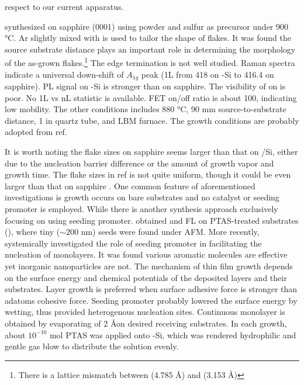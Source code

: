 respect to our current apparatus.

\citeauthor{Zhang2013h} synthesized  on sapphire (0001) using  powder and sulfur as precursor under 900 \si{\degreeCelsius}.\cite{Zhang2013h} Ar slightly mixed with  is used to tailor the shape of  flakes. It was found the source substrate distance plays an important role in determining the morphology of the as-grown flakes.\footnote{There is a lattice mismatch between  (4.785 \AA) and  (3.153 \AA)} The edge termination is not well studied. Raman spectra indicate a universal down-shift of $A_{1g}$ peak (1L from 418 on -Si to 416.4 on sapphire). PL signal on -Si is stronger than on sapphire. The visibility of  on  is poor. No 1L vs nL statistic is available. FET on/off ratio is about 100, indicating low mobility. The other conditions includes 880 \si{\degreeCelsius}, 90 mm source-to-substrate distance, 1 in quartz tube, and LBM furnace. The growth conditions are probably adopted from ref\cite{Huanga2013}.

It is worth noting the flake sizes on sapphire\cite{Zhang2013h} seems larger than that on /Si\cite{Peimyoo2013}, either due to the nucleation barrier difference or the amount of growth vapor and growth time. The flake sizes in ref \cite{Cong2013} is not quite uniform, though it could be even larger than that on sapphire \cite{Zhang2013h}. One common feature of aforementioned investigations is growth occurs on bare substrates and no catalyst or seeding promoter is employed. While there is another synthesis approach \cite{Lee2013,Ling2014} exclusively focusing on using seeding promoter. \citeauthor{Lee2013} obtained  and  FL on PTAS-treated substrates (), where tiny ($\sim 200$ nm) seeds were found under AFM. More recently, \citeauthor{Ling2014} systemically investigated the role of seeding promoter in facilitating the nucleation of  monolayers.\cite{Ling2014} It was found various aromatic molecules are effective yet inorganic nanoparticles are not. The mechanism of thin film growth depends on the surface energy and chemical potentials of the deposited layers and their substrates. Layer growth is preferred when surface adhesive force is stronger than adatoms cohesive force. Seeding promoter probably lowered the surface energy by wetting, thus provided heterogenous nucleation sites. Continuous  monolayer is obtained by evaporating  of 2 \AA on desired receiving substrates. In each growth, about $10^{-10}$ mol PTAS was applied onto -Si, which was rendered hydrophilic and gentle gas blow to distribute the solution evenly.

